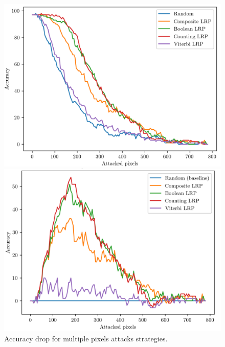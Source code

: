 \documentclass[aspectratio=169]{beamer}
\theoremstyle{definition}
\begin{document}
\begin{frame}
    \begin{figure}[H]
        \centering
        \vspace*{.5cm}
        \begin{minipage}{.49\textwidth}
            \centering
            \includegraphics[width=1\textwidth]{attack-graph-1.png}
        \end{minipage}
        \begin{minipage}{.49\textwidth}
            \centering
            \includegraphics[width=1\textwidth]{attack-graph-2.png}
        \end{minipage}
        \caption{Accuracy drop for multiple pixels attacks strategies.}
        \label{fig:attack-graphs}
    \end{figure}
\end{frame}
\end{document}
